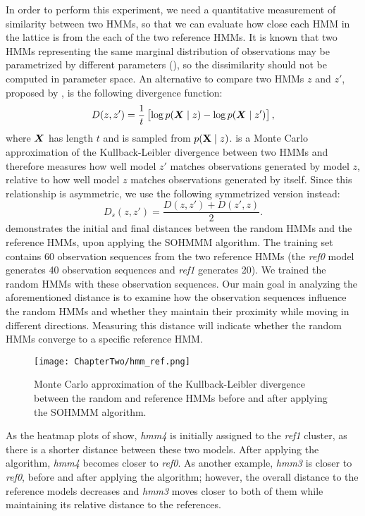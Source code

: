 In order to perform this experiment, we need a quantitative measurement of similarity between two HMMs, so that we can evaluate how close each HMM in the lattice is from the each of the two reference HMMs. It is known that two HMMs representing the same marginal distribution of observations may be parametrized by different parameters (\citet{Rabiner1989}), so the dissimilarity should not be computed in parameter space. An alternative to compare two HMMs $z$ and $z'$, proposed by \citet{Juang1985}, is the following divergence function:
\begin{equation}
D(z, z') = \frac{1}{t}\left[\log p({\bm{X}} \mid z) - \log p({\bm{X}} \mid z')\right],
\label{eq:hmm_div}
\end{equation}
where ${\bm{X}}$ has length $t$ and is sampled from $p({\mathbf{X}} \mid z)$.  is a Monte Carlo approximation of the Kullback-Leibler divergence between two HMMs and therefore measures how well model $z'$ matches observations generated by model $z$, relative to how well model $z$ matches observations generated by itself. Since this relationship is asymmetric, we use the following symmetrized version instead:
\begin{equation}
D_{s}(z,z') = \frac{D(z,z')+D(z',z)}{2}.
\label{eq:hmm_div_sym}
\end{equation}
 demonstrates the initial and final distances between the random HMMs and the reference HMMs, upon applying the SOHMMM algorithm. The training set contains 60 observation sequences from the two reference HMMs (the \textit{ref0} model generates 40 observation sequences and \textit{ref1} generates 20). We trained the random HMMs with these observation sequences. 
Our main goal in analyzing the aforementioned distance is to examine how the observation sequences influence the random HMMs and whether they maintain their proximity while moving in different directions. Measuring this distance will indicate whether the random HMMs converge to a specific reference HMM.

\begin{figure}[h]
	\centering
	\texttt{[image: ChapterTwo/hmm\_ref.png]}
	\caption{Monte Carlo approximation of the Kullback-Leibler divergence between the random and reference HMMs before and after applying the SOHMMM algorithm.}
	\label{fig:sohmmm_distances}      
\end{figure}

As the heatmap plots of  show, \textit{hmm4} is initially assigned to the \textit{ref1} cluster, as there is a shorter distance between these two models. After applying the algorithm, \textit{hmm4} becomes closer to \textit{ref0}. As another example, \textit{hmm3} is closer to \textit{ref0}, before and after applying the algorithm; however, the overall distance to the reference models decreases and \textit{hmm3} moves closer to both of them while maintaining its relative distance to the references. 

